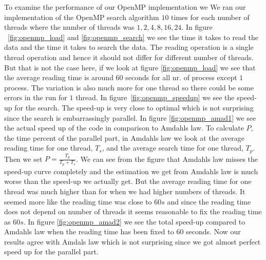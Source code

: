 \documentclass[a4paper,10pt]{article}
\begin{document}
 To examine the performance of our OpenMP implementation we 
 We ran our implementation of the OpenMP search algorithm $10$ times for each number
 of threads where the number of threads was $1,2,4,8,16,24$.
 In figure ~\ref{fig:openmp_load} and \ref{fig:openmp_search} we see the
 time it takes to read the data and the time it takes to search the data.
 The reading operation is a single thread operation and hence it should not differ for 
 different number of threads.  But that is not the case here, if we look at figure \ref{fig:openmp_load}
 we see that the average reading time is around $60$ seconds for all nr. of process except
 $1$ process.  The variation is also much more for one thread so there could be some 
 errors in the run for $1$ thread. 
 In figure~\ref{fig:openmp_speedup} we see the speed-up for the search. 
 The speed-up is very close to optimal which is not surprising since the search is embarrassingly
 parallel.
 In figure \ref{fig:openmp_amad1} we see the actual speed up of the code in comparison to Amdahls law.
 To calculate $P$, the time percent of the parallel part, in Amdahls law we look at the
 average reading time for one thread, $T_s$, and the average search time for one thread, $T_p$.
 Then we set $P=\frac{T_p}{T_p+T_s}$.  We can see from the figure that Amdahls law misses the speed-up 
 curve completely and the estimation we get from Amdahls law
 is much worse than the speed-up we actually get.
 But the average reading time for one thread was much higher than for when we had higher numbers of 
 threads.  It seemed more like the reading time was close to $60s$ and since the reading
 time does not depend on number of threads it seems reasonable to fix the reading time as $60s$.
 In figure \ref{fig:openmp_amad2} we see the total speed-up compared to Amdahls law
 when the reading time has been fixed to $60$ seconds.  Now our results agree with Amdals law
 which is not surprising since we got almost perfect speed up for the parallel part.
\end{document}
